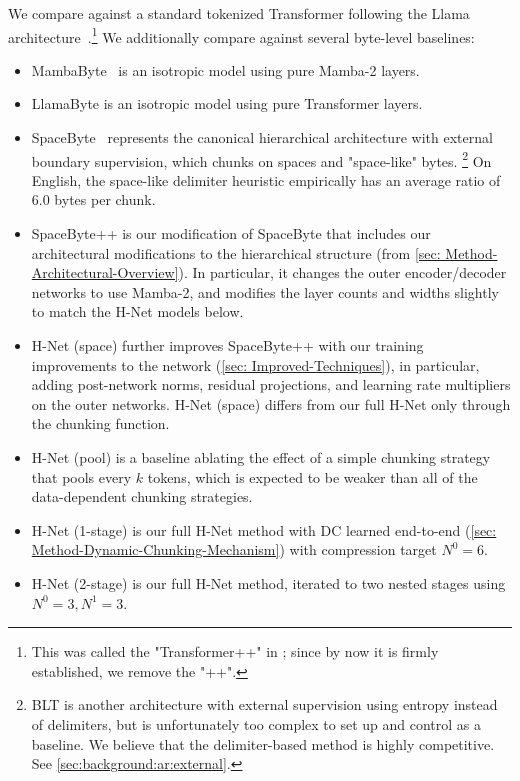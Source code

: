 \documentclass{article}
\newcommand{\citep}{\parencite}
\newcommand{\citet}{\textcite}
\theoremstyle{plain}
\theoremstyle{remark}
\begin{document}
We compare against a standard tokenized Transformer following the Llama architecture~\citep{Llama2,Llama3}.\footnote{This was called the "Transformer++" in \citet{Mamba}; since by now it is firmly established, we remove the "++".}
We additionally compare against several byte-level baselines:
\begin{itemize}
  \item MambaByte~\citep{MambaByte} is an isotropic model using pure Mamba-2 layers.
  \item LlamaByte is an isotropic model using pure Transformer layers.
  \item SpaceByte~\citep{SpaceByte} represents the canonical hierarchical architecture with external boundary supervision, which chunks on spaces and "space-like" bytes.
  \footnote{BLT is another architecture with external supervision using entropy instead of delimiters, but is unfortunately too complex to set up and control as a baseline. We believe that the delimiter-based method is highly competitive. See \cref{sec:background:ar:external}.}
  On English, the space-like delimiter heuristic empirically has an average ratio of $6.0$ bytes per chunk.
  \item SpaceByte++ is our modification of SpaceByte that includes our architectural modifications to the hierarchical structure (from \cref{sec: Method-Architectural-Overview}).
  In particular, it changes the outer encoder/decoder networks to use Mamba-2, and modifies the layer counts and widths slightly to match the H-Net models below.
  \item H-Net (space) further improves SpaceByte++ with our training improvements to the network (\cref{sec: Improved-Techniques}), in particular, adding post-network norms, residual projections, and learning rate multipliers on the outer networks. H-Net (space) differs from our full H-Net only through the chunking function.
  \item H-Net (pool) is a baseline ablating the effect of a simple chunking strategy that pools every $k$ tokens, which is expected to be weaker than all of the data-dependent chunking strategies.
  \item H-Net (1-stage) is our full H-Net method with DC learned end-to-end (\cref{sec: Method-Dynamic-Chunking-Mechanism}) with compression target $N^0=6$.
  \item H-Net (2-stage) is our full H-Net method, iterated to two nested stages using $N^0=3, N^1=3$.
\end{itemize}
\end{document}
